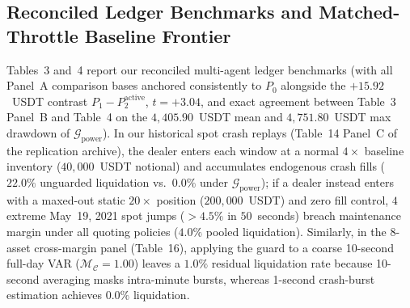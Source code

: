 \documentclass[11pt]{article}
\theoremstyle{remark}
\begin{document}
\subsection{Reconciled Ledger Benchmarks and Matched-Throttle Baseline Frontier}
Tables~3 and~4 report our reconciled multi-agent ledger benchmarks (with all Panel~A comparison bases anchored consistently to $P_0$ alongside the $+15.92$~USDT contrast $P_1 - P_2^{\text{active}}$, $t = +3.04$, and exact agreement between Table~3 Panel~B and Table~4 on the $4{,}405.90$~USDT mean and $4{,}751.80$~USDT max drawdown of $\mathcal{G}_{\text{power}}$). In our historical spot crash replays (Table~14 Panel~C of the replication archive), the dealer enters each window at a normal $4\times$ baseline inventory ($40{,}000$~USDT notional) and accumulates endogenous crash fills ($22.0\%$ unguarded liquidation vs.\ $0.0\%$ under $\mathcal{G}_{\text{power}}$); if a dealer instead enters with a maxed-out static $20\times$ position ($200{,}000$~USDT) and zero fill control, $4$ extreme May~19, 2021 spot jumps ($>4.5\%$ in $50$~seconds) breach maintenance margin under all quoting policies ($4.0\%$ pooled liquidation). Similarly, in the 8-asset cross-margin panel (Table~16), applying the guard to a coarse 10-second full-day VAR ($\mathcal{M}_{\mathcal{C}}=1.00$) leaves a $1.0\%$ residual liquidation rate because 10-second averaging masks intra-minute bursts, whereas 1-second crash-burst estimation achieves $0.0\%$ liquidation.
\end{document}

